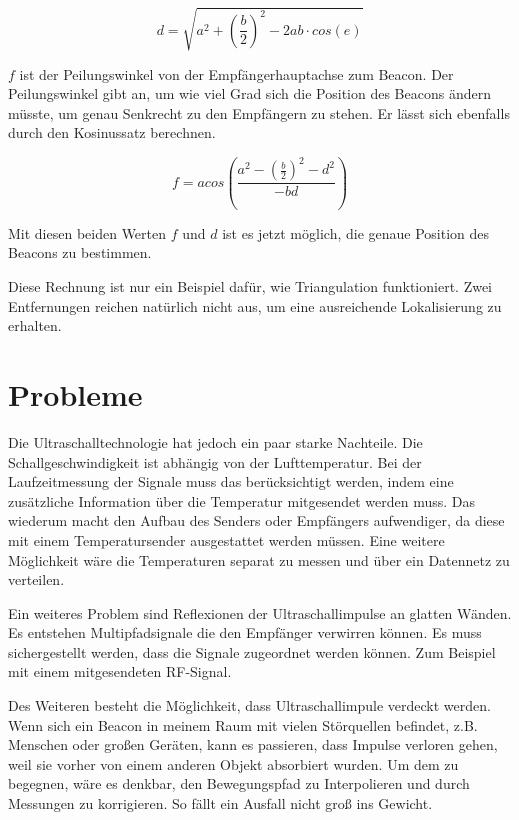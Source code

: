 \begin{equation}
  d = \sqrt{a^2 + \left(\frac{b}{2}\right)^2 - 2ab\cdot cos(e)}
\end{equation}

$f$ ist der Peilungswinkel von der Empfängerhauptachse zum Beacon. Der
Peilungswinkel gibt an, um wie viel Grad sich die Position des Beacons ändern müsste,
um genau Senkrecht zu den Empfängern zu stehen. Er lässt sich ebenfalls durch
den Kosinussatz berechnen.

\begin{equation}
  f = acos\left( \frac{a^2 - \left(\frac{b}{2}\right)^2 - d^2}{-bd} \right)
\end{equation}

Mit diesen beiden Werten $f$ und $d$ ist es jetzt möglich, die genaue
Position des Beacons zu bestimmen.

Diese Rechnung ist nur ein Beispiel dafür, wie Triangulation funktioniert.
Zwei Entfernungen reichen natürlich nicht aus, um eine ausreichende
Lokalisierung zu erhalten.

\section{Probleme}
Die Ultraschalltechnologie hat jedoch ein paar starke Nachteile. Die
Schallgeschwindigkeit ist abhängig von der Lufttemperatur. Bei der
Laufzeitmessung der Signale muss das berücksichtigt werden, indem eine
zusätzliche Information über die Temperatur mitgesendet werden muss. Das
wiederum macht den Aufbau des Senders oder Empfängers aufwendiger, da diese
mit einem Temperatursender ausgestattet werden müssen. Eine weitere
Möglichkeit wäre die Temperaturen separat zu messen und über ein Datennetz
zu verteilen.

Ein weiteres Problem sind Reflexionen der Ultraschallimpulse an glatten
Wänden. Es entstehen \dq Multipfadsignale\dq{} die den Empfänger verwirren
können. Es muss sichergestellt werden, dass die Signale zugeordnet werden
können. Zum Beispiel mit einem mitgesendeten RF-Signal.

Des Weiteren besteht die Möglichkeit, dass Ultraschallimpule verdeckt werden.
Wenn sich ein Beacon in meinem Raum mit vielen Störquellen befindet, z.B.
Menschen oder großen Geräten, kann es passieren, dass Impulse verloren gehen,
weil sie vorher von einem anderen Objekt absorbiert wurden. Um dem zu
begegnen, wäre es denkbar, den Bewegungspfad zu Interpolieren und durch
Messungen zu korrigieren. So fällt ein Ausfall nicht groß ins Gewicht.

